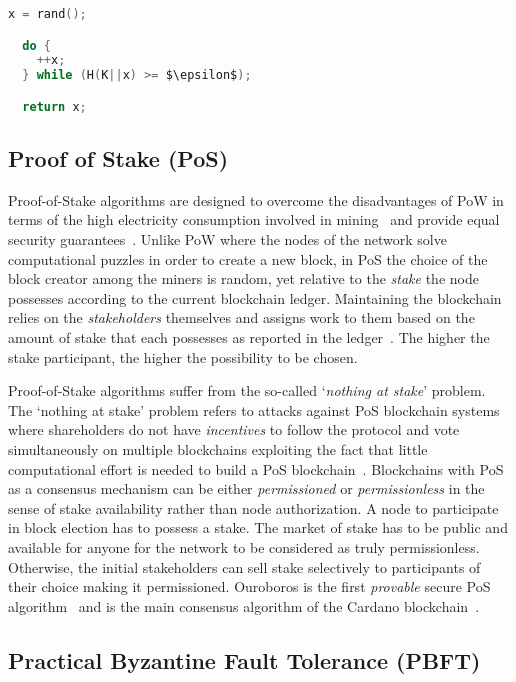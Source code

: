 \begin{lstlisting}[language=C, caption={A simple Proof-of-Work Algorithm}, mathescape=true]
  x = rand();

  do {
    ++x;
  } while (H(K||x) >= $\epsilon$);

  return x;
\end{lstlisting}

\subsection{Proof of Stake (PoS)}\label{blockchain:consensus:pos}

Proof-of-Stake algorithms are designed to overcome the disadvantages of PoW in terms of the high electricity consumption involved in mining~\cite{bl_consensus}
and provide equal security guarantees~\cite{Kiayias2017}. Unlike PoW where the nodes of the network solve computational puzzles in order to create a new block, in PoS the choice
of the block creator among the miners is random, yet relative to the \textit{stake} the node possesses according to the current blockchain ledger. Maintaining
the blockchain relies on the \textit{stakeholders} themselves and assigns work to them based on the amount of stake that each possesses as reported in the ledger~\cite{Kiayias2017}. The higher the stake participant, the higher the possibility to be chosen.

Proof-of-Stake algorithms suffer from the so-called `\textit{nothing at stake}' problem. The `nothing at stake' problem refers to attacks against PoS blockchain systems where shareholders do not have \textit{incentives} to follow the protocol and vote simultaneously on multiple blockchains exploiting the fact that little computational effort is needed to build a PoS blockchain~\cite{Kiayias2017}. Blockchains with PoS as a consensus mechanism can be either \textit{permissioned} or \textit{permissionless} in the sense of stake availability rather than node authorization. A node to participate in block election has to possess a stake. The market of stake has to be public and available for anyone for the network to be considered as truly permissionless. Otherwise, the initial stakeholders can sell stake selectively to participants of their choice making it permissioned. Ouroboros is the first \textit{provable} secure PoS algorithm~\cite{Kiayias2017} and is the main consensus algorithm of the Cardano blockchain~\cite{cardano_site}.

\subsection{Practical Byzantine Fault Tolerance (PBFT)}\label{blockchain:consensus:PBFT}


